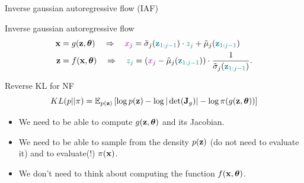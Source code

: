 \documentclass{beamer}
\begin{document}
\begin{frame}{Inverse gaussian autoregressive flow (IAF)}
	\begin{block}{Inverse gaussian autoregressive flow}
		\vspace{-0.5cm}
		\begin{align*}
			\mathbf{x} &= g(\mathbf{z}, \boldsymbol{\theta}) \quad \Rightarrow \quad {\color{violet}x_j} = \tilde{\sigma}_j ({\color{teal}\mathbf{z}_{1:j-1}}) \cdot {\color{teal} z_j} + \tilde{\mu}_j({\color{teal}\mathbf{z}_{1:j-1}}) \\
			\mathbf{z} &= f(\mathbf{x}, \boldsymbol{\theta}) \quad \Rightarrow \quad {\color{teal}z_j} = \left( {\color{violet} x_j} - \tilde{\mu}_j({\color{teal}\mathbf{z}_{1:j-1}})\right) \cdot \frac{1}{\tilde{\sigma}_j ({\color{teal}\mathbf{z}_{1:j-1}}) }.
		\end{align*}
		\vspace{-0.3cm}
	\end{block}
	\begin{block}{Reverse KL for NF}
		\vspace{-0.3cm}
		\[
			KL(p || \pi)  = \mathbb{E}_{p(\mathbf{z})} \left[ \log p(\mathbf{z}) -  \log |\det (\mathbf{J}_g)|  - \log \pi(g(\mathbf{z}, \boldsymbol{\theta})) \right]
		\]
		\vspace{-0.3cm}
		\begin{itemize}
			\item We need to be able to compute $g(\mathbf{z}, \boldsymbol{\theta})$ and its Jacobian.
			\item We need to be able to sample from the density $p(\mathbf{z})$ (do not need to evaluate it) and to evaluate(!) $\pi(\mathbf{x})$.
			\item We don’t need to think about computing the function $f(\mathbf{x}, \boldsymbol{\theta})$.
		\end{itemize}
	\end{block}
\end{frame}
\end{document}

